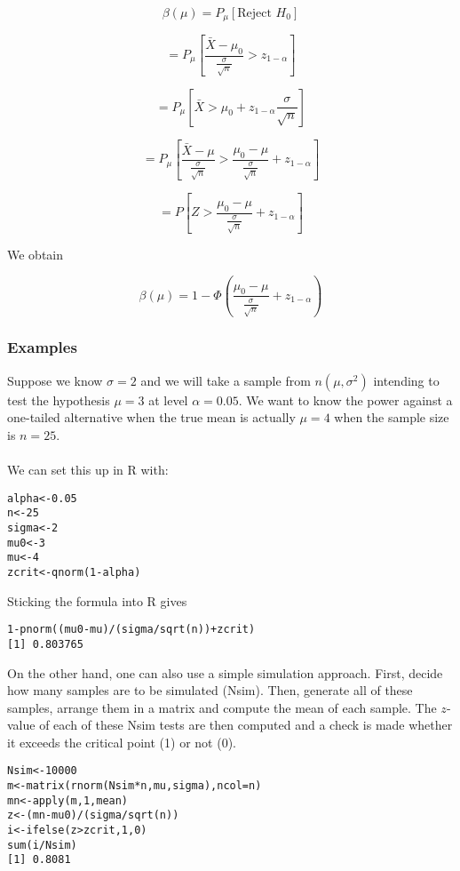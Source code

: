 \documentclass[12pt,a4paper]{article}
\theoremstyle{regla}
\theoremstyle{remark}
\theoremstyle{definition}
\theoremstyle{nonumberbreak}
\begin{document}
 $$\beta(\mu) = P_{\mu} [\text{Reject } H_0]$$

 $$= P_{\mu}[\frac{\bar {X} - \mu_0}{\frac{\sigma} {\sqrt{n}}} > z_{1- \alpha}]$$

 $$= P_{\mu} [\bar {X}> \mu_0 + z_{1- \alpha}{\frac{\sigma} {\sqrt{n}}}]$$

$$= P_{\mu} [\frac{\bar {X} - \mu}{\frac{\sigma} {\sqrt{n}}}> \frac{\mu_0 - \mu }{\frac{\sigma} {\sqrt{n}}}+ z_{1- \alpha}]$$

$$ = P[Z > \frac{\mu_0 - \mu}{\frac{\sigma} {\sqrt{n}}} + z_{1- \alpha}]$$

We obtain

$$
\beta(\mu) = 1 - \Phi \left ( \frac{\mu_0 - \mu }{\frac{\sigma} {\sqrt{n}}} + z_{1- \alpha} \right )
$$


\subsubsection{Examples}
\begin{xmpl}
Suppose we know $\sigma=2$ and we will take a sample 
from $n\left ( \mu, \sigma^2\right)$
intending to test the hypothesis $\mu=3$ at level $\alpha=0.05$. We want to know the power
against a one-tailed alternative when the true mean is actually $\mu=4$ when the sample size is $n=25$. \\\\

We can set this up in R with:
\begin{lstlisting}
alpha<-0.05
n<-25
sigma<-2
mu0<-3
mu<-4
zcrit<-qnorm(1-alpha)
\end{lstlisting}


Sticking the formula into R gives
\begin{lstlisting}
1-pnorm((mu0-mu)/(sigma/sqrt(n))+zcrit)
[1] 0.803765
\end{lstlisting}

On the other hand, one can also use a simple simulation approach. First, decide how many samples are to be simulated (Nsim). Then, generate all of these samples, arrange them in a matrix and compute the mean of each sample.  The $z$-value of each of these Nsim tests are then computed and a check is made whether it exceeds the critical point (1) or not (0).
\begin{lstlisting}
Nsim<-10000
m<-matrix(rnorm(Nsim*n,mu,sigma),ncol=n)
mn<-apply(m,1,mean)
z<-(mn-mu0)/(sigma/sqrt(n))
i<-ifelse(z>zcrit,1,0)
sum(i/Nsim)
[1] 0.8081
\end{lstlisting}
\end {xmpl}
\end{document}
